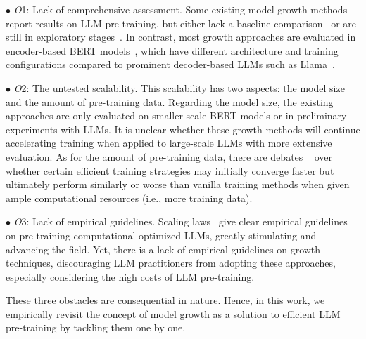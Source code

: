 \documentclass{article}
\begin{document}
\noindent $\bullet$ \textit{O}1:
Lack of comprehensive assessment. 
Some existing model growth methods report results on LLM pre-training, but either lack a baseline comparison~\citep{li2023flm101b} or are still in exploratory stages~\citep{wang2023learning,shen2022staged}.
In contrast, most growth approaches are evaluated in encoder-based BERT models~\cite{gong2019efficient, chen2021bert2bert, yang2020progressively, wang2023lemon, shen2022staged, evci2022gradmax, yao2024masked}, which have different architecture and training configurations compared to prominent decoder-based LLMs such as Llama~\citep{touvron2023llama}. 

\noindent $\bullet$ \textit{O}2:
The untested scalability. This scalability has two aspects: the model size and the amount of pre-training data. 
Regarding the model size, the existing approaches are only evaluated on smaller-scale BERT models or in preliminary experiments with LLMs. 
It is unclear whether these growth methods will continue accelerating training when applied to large-scale LLMs with more extensive evaluation.
As for the amount of pre-training data, there are debates
~\cite{kaddour2023train} over whether certain efficient training strategies may initially converge faster but ultimately perform similarly or worse than vanilla training methods when given ample computational resources (i.e., more training data).

\noindent $\bullet$ \textit{O}3:
Lack of empirical guidelines. 
Scaling laws~\citep{kaplan2020scaling,hoffmann2022training} give clear empirical guidelines on pre-training computational-optimized LLMs, greatly stimulating and advancing the field.
Yet, there is a lack of empirical guidelines on growth techniques, discouraging LLM practitioners from adopting these approaches, especially considering the high costs of LLM pre-training.

These three obstacles are consequential in nature. Hence, in this work, we empirically revisit the concept of model growth as a solution to efficient LLM pre-training by tackling them one by one.
\end{document}
